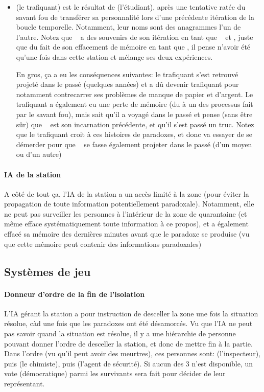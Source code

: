 {\begin{itemize}
		\item \nmPlayerII (le trafiquant) est le résultat de \nmPlayerIII (l'étudiant), après une tentative ratée du savant fou de transférer sa personnalité lors d'une précédente itération de la boucle temporelle. Notamment, leur noms sont des anagrammes l'un de l'autre. Notez que \nmPlayerI ~ a des souvenirs de son itération en tant que \nmPlayerII ~ et \nmPlayerIII, juste que du fait de son effacement de mémoire en tant que \nmPlayerII, il pense n'avoir été qu'une fois dans cette station et mélange ses deux expériences.
		
		En gros, ça a eu les conséquences suivantes: le trafiquant s'est retrouvé projeté dans le passé (quelques années) et a dû devenir trafiquant pour notamment contrecarrer ses problèmes de manque de papier et d'argent. Le trafiquant a également eu une perte de mémoire (du à un des processus fait par le savant fou), mais sait qu'il a voyagé dans le passé et pense (sans être sûr) que \nmPlayerIII ~ est son incarnation précédente, et qu'il s'est passé un truc. Notez que le trafiquant croit à ces histoires de paradoxes, et donc va essayer de se démerder pour que \nmPlayerIII ~ se fasse également projeter dans le passé (d'un moyen ou d'un autre)
	\end{itemize}
	
	\paragraph{IA de la station} A côté de tout ça, l'IA de la station a un accès limité à la zone (pour éviter la propagation de toute information potentiellement paradoxale). Notamment, elle ne peut pas surveiller les personnes à l'intérieur de la zone de quarantaine (et même efface systématiquement toute information à ce propos), et a également effacé sa mémoire des dernières minutes avant que le paradoxe se produise (vu que cette mémoire peut contenir des informations paradoxales)
	
	
	\subsection{Systèmes de jeu}
	
	\paragraph{Donneur d'ordre de la fin de l'isolation} L'IA gérant la station a pour instruction de desceller la zone une fois la situation résolue, càd une fois que les paradoxes ont été désamorcés. Vu que l'IA ne peut pas savoir quand la situation est résolue, il y a une hiérarchie de personne pouvant donner l'ordre de desceller la station, et donc de mettre fin à la partie. Dans l'ordre (vu qu'il peut avoir des meurtres), ces personnes sont: \nmPlayerVII (l'inspecteur), puis \nmPlayerXII (le chimiste), puis \nmPlayerVIII (l'agent de sécurité). Si aucun des 3 n'est disponible, un vote (démocratique) parmi les survivants sera fait pour décider de leur représentant.
	
}
